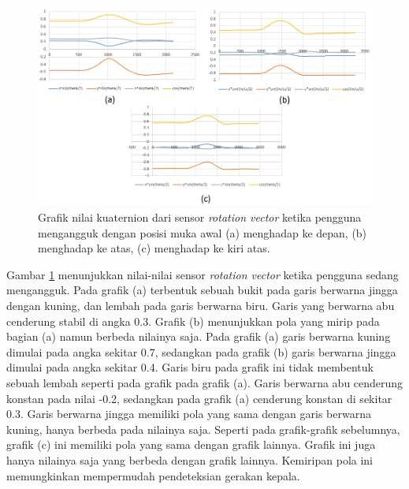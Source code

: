 \begin{figure}[htbp]
\centering
\includegraphics[scale=0.6]{Gambar/grafik-sensor-rot-vector-mengangguk.png}
\caption{Grafik nilai kuaternion dari sensor \textit{rotation vector} ketika pengguna mengangguk dengan posisi muka awal (a) menghadap ke depan, (b) menghadap ke atas, (c) menghadap ke kiri atas.} 
\label{fig:grafik-sensor-rot-vector-mengangguk}
\end{figure}

Gambar \ref{fig:grafik-sensor-rot-vector-mengangguk} menunjukkan nilai-nilai sensor \textit{rotation vector} ketika pengguna sedang mengangguk. Pada grafik (a) terbentuk sebuah bukit pada garis berwarna jingga dengan kuning, dan lembah pada garis berwarna biru. Garis yang berwarna abu cenderung stabil di angka 0.3. Grafik (b) menunjukkan pola yang mirip pada bagian (a) namun berbeda nilainya saja. Pada grafik (a) garis berwarna kuning dimulai pada angka sekitar 0.7, sedangkan pada grafik (b) garis berwarna jingga dimulai pada angka sekitar 0.4. Garis biru pada grafik ini tidak membentuk sebuah lembah seperti  pada grafik pada grafik (a). Garis berwarna abu cenderung konstan pada nilai -0.2, sedangkan pada grafik (a) cenderung konstan di sekitar 0.3. Garis berwarna jingga memiliki pola yang sama dengan garis berwarna kuning, hanya berbeda pada nilainya saja. Seperti pada grafik-grafik sebelumnya, grafik (c) ini memiliki pola yang sama dengan grafik lainnya. Grafik ini juga hanya nilainya saja yang berbeda dengan grafik lainnya. Kemiripan pola ini memungkinkan mempermudah pendeteksian gerakan kepala. 

